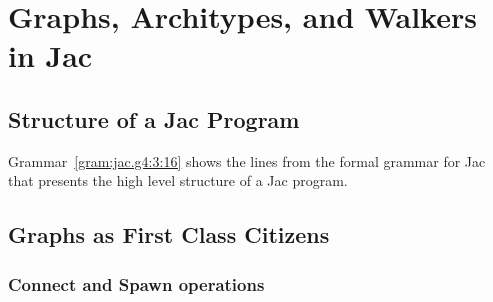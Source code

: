 \chapter{Graphs, Architypes, and Walkers in Jac}



\section{Structure of a Jac Program}

\par [Introduce structure of a jac program] \par
\par [Specify the differnce between graph architypes, graph instantiations, and walkers]\par
\par [Present simple program that utilizes the structures]\par
\par [Present variations on articulating the same program]\par
\par [Code blocks]\par

\begin{nerd}
    Grammar~\ref{gram:jac.g4:3:16} shows the lines from the formal grammar for Jac that presents the high level structure of a Jac program.
\end{nerd}

\section{Graphs as First Class Citizens}

\subsection{Connect and Spawn operations}

\par
{}
\par
{}


\par
{}
\par
{}

